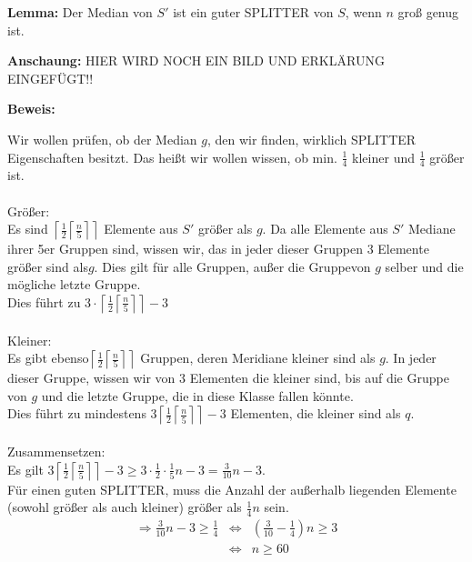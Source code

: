 \begin{description}
\begin{description}

\item{\bfseries Lemma:} Der Median von $S'$ ist ein guter SPLITTER von $S$, wenn $n$ groß genug ist.

\item{\bfseries Anschaung:} HIER WIRD NOCH EIN BILD UND ERKLÄRUNG EINGEFÜGT!!

\item{\bfseries Beweis:}

Wir wollen prüfen, ob der Median $g$, den wir finden, wirklich SPLITTER Eigenschaften besitzt. Das heißt wir wollen wissen, ob min. $\frac{1}{4}$ kleiner und $\frac{1}{4}$ größer ist.\\
\vspace{\baselineskip}\\
Größer:\\
Es sind $\left\lceil \frac{1}{2} \left\lceil \frac{n}{5} \right\rceil \right\rceil$ Elemente aus $S'$ größer als $g$. Da alle Elemente aus $S'$ Mediane ihrer 5er Gruppen sind, wissen wir, das in jeder dieser Gruppen 3 Elemente größer sind als$g$. Dies gilt für alle Gruppen, außer die Gruppevon $g$ selber und die mögliche letzte Gruppe.\\
Dies führt zu $3 \cdot \left\lceil \frac{1}{2} \left\lceil \frac{n}{5} \right\rceil \right\rceil -3$\\
\vspace{\baselineskip}\\ 
Kleiner:\\
Es gibt ebenso$ \left\lceil \frac{1}{2} \left\lceil \frac{n}{5} \right\rceil \right \rceil$ Gruppen, deren Meridiane kleiner sind als $g$. In jeder dieser Gruppe, wissen wir von 3 Elementen die kleiner sind, bis auf die Gruppe von $g$ und die letzte Gruppe, die in diese Klasse fallen könnte.\\
Dies führt zu mindestens $3 \left\lceil \frac{1}{2} \left\lceil \frac{n}{5} \right\rceil \right\rceil -3$ Elementen, die kleiner sind als $q$.\\
\vspace{\baselineskip}\\
Zusammensetzen:\\
Es gilt $3 \left\lceil \frac{1}{2} \left\lceil \frac{n}{5} \right\rceil \right\rceil -3 \geq 3 \cdot \frac{1}{2} \cdot \frac{1}{5} n - 3 = \frac{3}{10}n -3$.\\
Für einen guten SPLITTER, muss die Anzahl der außerhalb liegenden Elemente (sowohl größer als auch kleiner) größer als $\frac{1}{4} n$ sein.\\
$$
\begin{array}{rcl}
\Rightarrow \frac{3}{10}n - 3 \geq \frac{1}{4} &\Leftrightarrow& \left( \frac{3}{10} -  \frac{1}{4} \right)n \geq 3\\
&\Leftrightarrow& n\geq 60
\end{array}
$$


\end{description}
\end{description}
